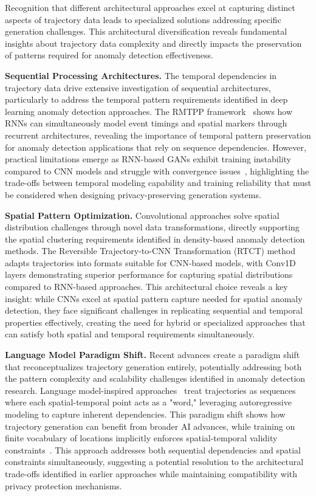 \documentclass[runningheads]{llncs}
\begin{document}
Recognition that different architectural approaches excel at capturing distinct aspects of trajectory data leads to specialized solutions addressing specific generation challenges. This architectural diversification reveals fundamental insights about trajectory data complexity and directly impacts the preservation of patterns required for anomaly detection effectiveness.

\textbf{Sequential Processing Architectures.} The temporal dependencies in trajectory data drive extensive investigation of sequential architectures, particularly to address the temporal pattern requirements identified in deep learning anomaly detection approaches. The RMTPP framework~\cite{du2016recurrent} shows how RNNs can simultaneously model event timings and spatial markers through recurrent architectures, revealing the importance of temporal pattern preservation for anomaly detection applications that rely on sequence dependencies. However, practical limitations emerge as RNN-based GANs exhibit training instability compared to CNN models and struggle with convergence issues~\cite{merhi2024synthetic}, highlighting the trade-offs between temporal modeling capability and training reliability that must be considered when designing privacy-preserving generation systems.

\textbf{Spatial Pattern Optimization.} Convolutional approaches solve spatial distribution challenges through novel data transformations, directly supporting the spatial clustering requirements identified in density-based anomaly detection methods. The Reversible Trajectory-to-CNN Transformation (RTCT) method~\cite{merhi2024synthetic} adapts trajectories into formats suitable for CNN-based models, with Conv1D layers demonstrating superior performance for capturing spatial distributions compared to RNN-based approaches. This architectural choice reveals a key insight: while CNNs excel at spatial pattern capture needed for spatial anomaly detection, they face significant challenges in replicating sequential and temporal properties effectively, creating the need for hybrid or specialized approaches that can satisfy both spatial and temporal requirements simultaneously.

\textbf{Language Model Paradigm Shift.} Recent advances create a paradigm shift that reconceptualizes trajectory generation entirely, potentially addressing both the pattern complexity and scalability challenges identified in anomaly detection research. Language model-inspired approaches~\cite{zhang2025end} treat trajectories as sequences where each spatial-temporal point acts as a "word," leveraging autoregressive modeling to capture inherent dependencies. This paradigm shift shows how trajectory generation can benefit from broader AI advances, while training on finite vocabulary of locations implicitly enforces spatial-temporal validity constraints~\cite{kong2023mobility}. This approach addresses both sequential dependencies and spatial constraints simultaneously, suggesting a potential resolution to the architectural trade-offs identified in earlier approaches while maintaining compatibility with privacy protection mechanisms.
\end{document}
